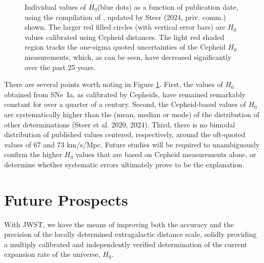 \documentclass[12pt,modern]{aastex631}
\newcommand{\ho}{$H_{0}$\xspace}
\newcommand{\sne}{SNe~Ia\xspace}
\begin{document}
\begin{figure}[ht!]
\caption{Individual values of \ho (blue dots) as a function of publication date, using the compilation of \cite{steer_2020}, updated by Steer (2024, priv. comm.) shown. The larger red filled circles (with vertical error bars) are \ho values calibrated using Cepheid distances. The light red shaded region tracks the one-sigma quoted uncertainties of the Cepheid \ho measurements, which, as can be seen, have decreased significantly over the past 25 years. }
\label{fig:ho_only_withtime}
\end{figure}

\medskip\medskip\medskip


There are several points worth noting in Figure \ref{fig:ho_only_withtime}. First, the values of \ho obtained from \sne, as calibrated by Cepheids, have remained remarkably constant for over a quarter of a century. Second, the Cepheid-based values of \ho are systematically higher than the (mean, median or mode) of the distribution of other determinations (Steer et al. 2020, 2024). Third, there is no bimodal distribution of published values centered, respectively, around the oft-quoted values of 67 and 73 km/s/Mpc. Future studies will be required to unambiguously confirm the higher \ho values that are based on Cepheid measurements alone, or determine whether systematic errors ultimately prove to be the explanation.


\medskip\medskip\medskip\medskip\medskip\medskip\medskip\medskip\medskip

\section{Future Prospects}
\label{sec:future}


With JWST, we have the means of improving both the accuracy and the precision of the locally determined extragalactic distance scale, solidly providing a multiply calibrated and independently verified determination of the current expansion rate of the universe, \ho. 
\end{document}
